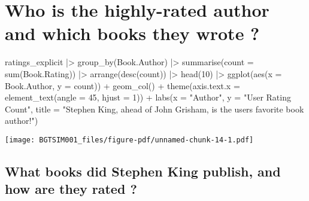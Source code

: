 \documentclass[
]{report}
\newenvironment{Shaded}{\begin{snugshade}}{\end{snugshade}}
\newcommand{\AttributeTok}[1]{\textcolor[rgb]{0.40,0.45,0.13}{#1}}
\newcommand{\DecValTok}[1]{\textcolor[rgb]{0.68,0.00,0.00}{#1}}
\newcommand{\FunctionTok}[1]{\textcolor[rgb]{0.28,0.35,0.67}{#1}}
\newcommand{\NormalTok}[1]{\textcolor[rgb]{0.00,0.23,0.31}{#1}}
\newcommand{\SpecialCharTok}[1]{\textcolor[rgb]{0.37,0.37,0.37}{#1}}
\newcommand{\StringTok}[1]{\textcolor[rgb]{0.13,0.47,0.30}{#1}}
\begin{document}
\section{Who is the highly-rated author and which books they wrote
?}\label{who-is-the-highly-rated-author-and-which-books-they-wrote}

\begin{Shaded}
\begin{Highlighting}[]
\NormalTok{ratings\_explicit }\SpecialCharTok{|\textgreater{}} 
  \FunctionTok{group\_by}\NormalTok{(Book.Author) }\SpecialCharTok{|\textgreater{}} 
  \FunctionTok{summarise}\NormalTok{(}\AttributeTok{count =} \FunctionTok{sum}\NormalTok{(Book.Rating)) }\SpecialCharTok{|\textgreater{}} 
  \FunctionTok{arrange}\NormalTok{(}\FunctionTok{desc}\NormalTok{(count)) }\SpecialCharTok{|\textgreater{}} 
  \FunctionTok{head}\NormalTok{(}\DecValTok{10}\NormalTok{) }\SpecialCharTok{|\textgreater{}}
  \FunctionTok{ggplot}\NormalTok{(}\FunctionTok{aes}\NormalTok{(}\AttributeTok{x =}\NormalTok{ Book.Author, }\AttributeTok{y =}\NormalTok{ count)) }\SpecialCharTok{+}
  \FunctionTok{geom\_col}\NormalTok{() }\SpecialCharTok{+}
  \FunctionTok{theme}\NormalTok{(}\AttributeTok{axis.text.x =} \FunctionTok{element\_text}\NormalTok{(}\AttributeTok{angle =} \DecValTok{45}\NormalTok{, }\AttributeTok{hjust =} \DecValTok{1}\NormalTok{)) }\SpecialCharTok{+}
  \FunctionTok{labs}\NormalTok{(}\AttributeTok{x =} \StringTok{"Author"}\NormalTok{, }
       \AttributeTok{y =} \StringTok{"User Rating Count"}\NormalTok{,}
       \AttributeTok{title =} \StringTok{"Stephen King, ahead of John Grisham, is the user\textquotesingle{}s favorite book author!"}\NormalTok{)}
\end{Highlighting}
\end{Shaded}

\texttt{[image: BGTSIM001\_files/figure-pdf/unnamed-chunk-14-1.pdf]}

\subsection{What books did Stephen King publish, and how are they rated
?}\label{what-books-did-stephen-king-publish-and-how-are-they-rated}
\end{document}
